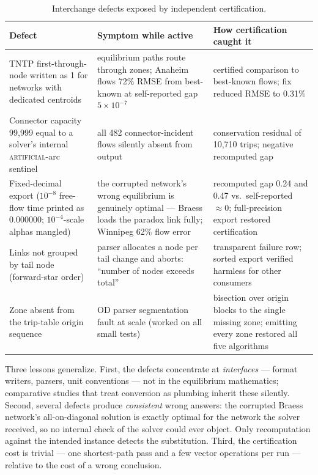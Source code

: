 \documentclass[11pt]{article}
\begin{document}
\begin{table}[h]
\centering\small
\caption{Interchange defects exposed by independent certification.}
\label{tab:defects}
\begin{tabular}{p{4.6cm}p{5.0cm}p{4.8cm}}
\toprule
Defect & Symptom while active & How certification caught it \\
\midrule
TNTP first-through-node written as 1 for networks with dedicated centroids
& equilibrium paths route through zones; Anaheim flows 72\% RMSE from
best-known at self-reported gap $5\times10^{-7}$ & certified comparison to
best-known flows; fix reduced RMSE to 0.31\% \\
Connector capacity 99{,}999 equal to a solver's internal
\textsc{artificial}-arc sentinel & all 482 connector-incident flows
silently absent from output & conservation residual of 10{,}710 trips;
negative recomputed gap \\
Fixed-decimal export ($10^{-8}$ free-flow time printed as 0.000000;
$10^{-4}$-scale alphas mangled) & the corrupted network's wrong equilibrium
is genuinely optimal --- Braess loads the paradox link fully; Winnipeg 62\%
flow error & recomputed gap 0.24 and 0.47 vs.\ self-reported
$\approx 0$; full-precision export restored certification \\
Links not grouped by tail node (forward-star order) & parser allocates a
node per tail change and aborts: ``number of nodes exceeds total'' &
transparent failure row; sorted export verified harmless for other
consumers \\
Zone absent from the trip-table origin sequence & OD parser segmentation
fault at scale (worked on all small tests) & bisection over origin blocks to
the single missing zone; emitting every zone restored all five algorithms \\
\bottomrule
\end{tabular}
\end{table}

Three lessons generalize. First, the defects concentrate at
\emph{interfaces} --- format writers, parsers, unit conventions --- not in
the equilibrium mathematics; comparative studies that treat conversion as
plumbing inherit these silently. Second, several defects produce
\emph{consistent} wrong answers: the corrupted Braess network's
all-on-diagonal solution is exactly optimal for the network the solver
received, so no internal check of the solver could ever object. Only
recomputation against the intended instance detects the substitution.
Third, the certification cost is trivial --- one shortest-path pass and a
few vector operations per run --- relative to the cost of a wrong
conclusion.
\end{document}
